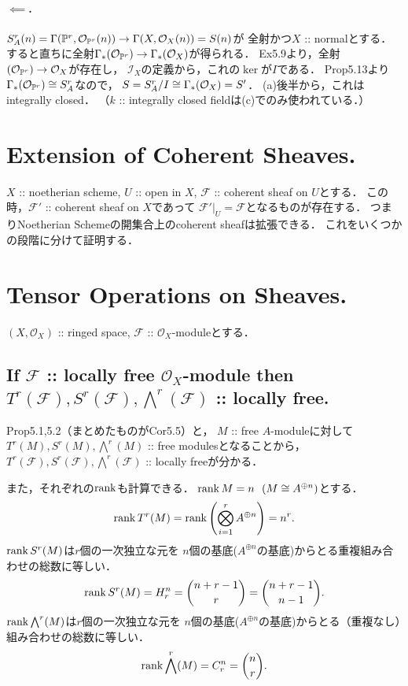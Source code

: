 \documentclass[a4paper]{jsarticle}
\newcommand{\shF}{\mathcal{F}}
\newcommand{\shI}{\mathcal{I}}
\newcommand{\shO}{\mathcal{O}}
\begin{document}
    \paragraph{$\impliedby$.}
    $S_A^r(n)=\Gamma(\proj^r, \shO_{\proj^r}(n)) \to \Gamma(X,\shO_X(n))=S(n)$が
    全射かつ$X$ :: normalとする．
    すると直ちに全射$\Gamma_*(\shO_{\proj^r}) \to \Gamma_*(\shO_X)$が得られる．
    Ex5.9より，全射$(\shO_{\proj^r}) \to \shO_X$が存在し，
    $\shI_X$の定義から，これの$\ker$が$I$である．
    Prop5.13より$\Gamma_*(\shO_{\proj^r}) \iso S_A^r$なので，
    $S=S_A^r/I \iso \Gamma_*(\shO_X)=S'$．
    (a)後半から，これはintegrally closed．
    （$k$ :: integrally closed fieldは(c)でのみ使われている．）

\section{Extension of Coherent Sheaves.} %
    $X$ :: noetherian scheme, $U$ :: open in $X$, 
    $\shF$ :: coherent sheaf on $U$とする．
    この時，$\shF'$ :: coherent sheaf on $X$であって
    $\shF'|_U=\shF$となるものが存在する．
    つまりNoetherian Schemeの開集合上のcoherent sheafは拡張できる．
    これをいくつかの段階に分けて証明する．

\section{Tensor Operations on Sheaves.} %
    $(X, \shO_X)$ :: ringed space, $\shF$ :: $\shO_X$-moduleとする．

    \subsection{If $\shF$ :: locally free $\shO_X$-module then 
        $T^r(\shF), S^r(\shF), \bigwedge^r(\shF)$ :: locally free.}
    Prop5.1,5.2（まとめたものがCor5.5）と，
    $M$ :: free $A$-moduleに対して
    $T^r(M), S^r(M), \bigwedge^r(M)$ :: free modulesとなることから，
    $T^r(\shF), S^r(\shF), \bigwedge^r(\shF)$ :: locally freeが分かる．

    また，それぞれの$\operatorname{rank}$も計算できる．
    $\operatorname{rank} M=n ~~(M \cong A^{\oplus n})$とする．
    \[ \operatorname{rank} T^r(M)=\operatorname{rank} \left(\bigotimes_{i=1}^r A^{\oplus n} \right)=n^r. \]
    $\operatorname{rank} S^r(M)$は$r$個の一次独立な元を
    $n$個の基底($A^{\oplus n}$の基底)からとる重複組み合わせの総数に等しい．
    \[ \operatorname{rank} S^r(M)=H_r^n=\binom{n+r-1}{r}=\binom{n+r-1}{n-1}. \]
    $\operatorname{rank} \bigwedge^r(M)$は$r$個の一次独立な元を
    $n$個の基底($A^{\oplus n}$の基底)からとる（重複なし）組み合わせの総数に等しい．
    \[ \operatorname{rank} \bigwedge^r(M)=C_r^n=\binom{n}{r}. \]
\end{document}
